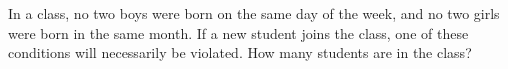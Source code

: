 In a class, no two boys were born on the same day of the week, and no two girls were born in the same month. If a new student joins the class, one of these conditions will necessarily be violated. How many students are in the class?
